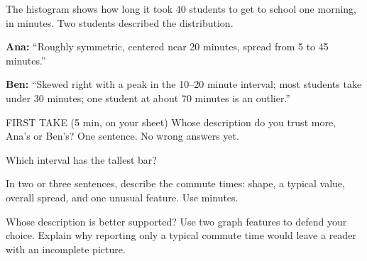 \documentclass[14pt]{extarticle}
\begin{document}
\pagestyle{empty}


\noindent\begin{minipage}[t]{0.57\linewidth}
\vspace{0pt}
The histogram shows how long it took 40 students to get to school one morning, in minutes. Two students described the distribution.\par\smallskip \textbf{Ana:} ``Roughly symmetric, centered near 20 minutes, spread from 5 to 45 minutes.''\par \textbf{Ben:} ``Skewed right with a peak in the 10--20 minute interval; most students take under 30 minutes; one student at about 70 minutes is an outlier.''\par
\end{minipage}\hfill
\begin{minipage}[t]{0.40\linewidth}
\vspace{0pt}
\begin{center}
\end{center}
\end{minipage}

\begin{firsttakebox}{FIRST TAKE (5 min, on your sheet)}
Whose description do you trust more, Ana's or Ben's? One sentence. No wrong answers yet.
\end{firsttakebox}

\begin{description}[leftmargin=1.15in, labelwidth=1in, itemsep=2pt, topsep=2pt]
  \item[\dokbadge{1}~(a)] Which interval has the tallest bar?
  \item[\dokbadge{2}~(b)] In two or three sentences, describe the commute times: shape, a typical value, overall spread, and one unusual feature. Use minutes.
  \item[\dokbadge{3}~(c)] Whose description is better supported? Use two graph features to defend your choice. Explain why reporting only a typical commute time would leave a reader with an incomplete picture.
\end{description}
\end{document}
